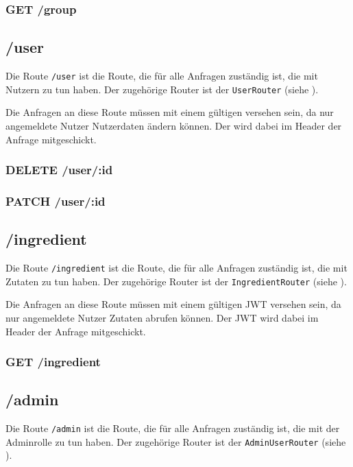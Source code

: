 \documentclass{entwurfsheft}
\begin{document}
\subsubsection*{GET /group}

\subsection{/user}
Die Route \texttt{/user} ist die Route, die für alle Anfragen zuständig ist, die mit Nutzern zu tun haben.
Der zugehörige Router ist der \texttt{UserRouter} (siehe ).

Die Anfragen an diese Route müssen mit einem gültigen  versehen sein, da nur angemeldete Nutzer Nutzerdaten ändern können.
Der  wird dabei im Header der Anfrage mitgeschickt.

\subsubsection*{DELETE /user/:id}
\subsubsection*{PATCH /user/:id}

\subsection{/ingredient}
Die Route \texttt{/ingredient} ist die Route, die für alle Anfragen zuständig ist, die mit Zutaten zu tun haben.
Der zugehörige Router ist der \texttt{IngredientRouter} (siehe ).

Die Anfragen an diese Route müssen mit einem gültigen JWT versehen sein, da nur angemeldete Nutzer Zutaten abrufen können.
Der JWT wird dabei im Header der Anfrage mitgeschickt.


\subsubsection*{GET /ingredient}

\subsection{/admin}
Die Route \texttt{/admin} ist die Route, die für alle Anfragen zuständig ist, die mit der Adminrolle zu tun haben.
Der zugehörige Router ist der \texttt{AdminUserRouter} (siehe ).
\end{document}
